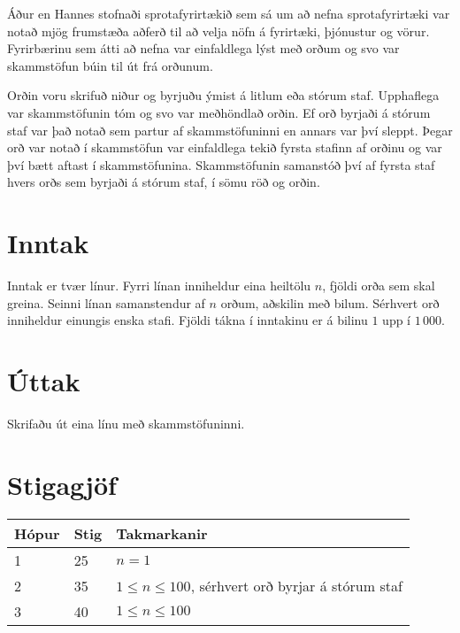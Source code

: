 
Áður en Hannes stofnaði sprotafyrirtækið sem sá um að nefna sprotafyrirtæki
var notað mjög frumstæða aðferð til að velja nöfn á fyrirtæki, þjónustur og vörur.
Fyrirbærinu sem átti að nefna var einfaldlega lýst með orðum og svo var skammstöfun búin til út frá orðunum.

Orðin voru skrifuð niður og byrjuðu ýmist á litlum eða stórum staf.
Upphaflega var skammstöfunin tóm og svo var meðhöndlað orðin.
Ef orð byrjaði á stórum staf var það notað sem partur af skammstöfuninni en annars var því sleppt.
Þegar orð var notað í skammstöfun var einfaldlega tekið fyrsta stafinn af orðinu og var því bætt aftast í skammstöfunina.
Skammstöfunin samanstóð því af fyrsta staf hvers orðs sem byrjaði á stórum staf, í sömu röð og orðin.

\section*{Inntak}
Inntak er tvær línur.
Fyrri línan inniheldur eina heiltölu $n$, fjöldi orða sem skal greina.
Seinni línan samanstendur af $n$ orðum, aðskilin með bilum.
Sérhvert orð inniheldur einungis enska stafi.
Fjöldi tákna í inntakinu er á bilinu $1$ upp í $1\,000$.

\section*{Úttak}
Skrifaðu út eina línu með skammstöfuninni.

\section*{Stigagjöf}
\begin{tabular}{|l|l|l|}
\hline
Hópur & Stig & Takmarkanir \\ \hline
1     & 25   & $n = 1$ \\ \hline
2     & 35   & $1 \leq n \leq 100$, sérhvert orð byrjar á stórum staf \\ \hline
3     & 40   & $1 \leq n \leq 100$ \\ \hline
\end{tabular}

